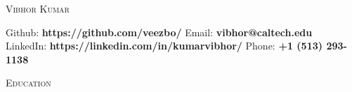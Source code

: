\documentclass[9pt]{article}
\newenvironment{changemargin}[2]{%
  \begin{list}{}{%
    \setlength{\topsep}{0pt}%
    \setlength{\leftmargin}{#1}%
    \setlength{\rightmargin}{#2}%
    \setlength{\listparindent}{\parindent}%
    \setlength{\itemindent}{\parindent}%
    \setlength{\parsep}{\parskip}%
  }%
  \item[]}{\end{list}
}
\newcommand{\lineover}{
	\begin{changemargin}{-0.05in}{-0.05in}
		\vspace*{-8pt}
		\hrulefill \\
		\vspace*{-2pt}
	\end{changemargin}
}
\newcommand{\header}[1]{
	\begin{changemargin}{-0.5in}{-0.5in}
		\scshape{#1}\\
  	\lineover
	\end{changemargin}
}
\begin{document}
\begin{center} 
	{\Large \scshape Vibhor Kumar} 
\end{center}
	\vspace*{-2pt}
\hspace{-12mm} Github: \hspace{3mm} \textbf{https://github.com/veezbo/}
\hspace{46mm} Email: \hspace{0.1mm} \textbf{vibhor@caltech.edu} \\
\vspace*{1pt}
\hspace{-12mm} LinkedIn: \hspace{0.25mm} \textbf{https://linkedin.com/in/kumarvibhor/} \hspace{26.75mm} Phone: \textbf{+1 (513) 293-1138}\\
\vspace{3pt}
\smallskip
\header{Education}
\end{document}
